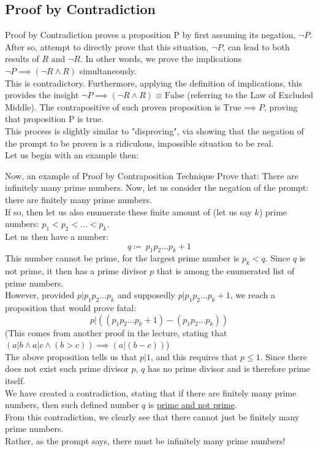 \subsection{Proof by Contradiction}
Proof by Contradiction proves a proposition P by first assuming its negation, $\neg P$. After so, attempt to directly prove that this situation, $\neg P$, can lead to both results of $R$ and $\neg R$. In other words, we prove the implications $\neg P \implies (\neg R \land R)$ simultaneously. \\
This is contradictory. Furthermore, applying the definition of implications, this provides the insight $\neg P \implies (\neg R \land R) \equiv \text{False}$ (referring to the Law of Excluded Middle). The contrapositive of such proven proposition is $\text{True} \implies P$, proving that proposition P is true. \\
This process is slightly similar to "disproving", via showing that the negation of the prompt to be proven is a ridiculous, impossible situation to be real. \\
Let us begin with an example then:
\begin{ln-think}{Now, an example of Proof by Contraposition Technique}{}
    Prove that: There are infinitely many prime numbers.
    \tcblower
    Now, let us consider the negation of the prompt: there are finitely many prime numbers. \\
    If so, then let us also enumerate these finite amount of (let us say $k$) prime numbers: $p_1 < p_2 < \dots < p_k$. \\
    Let us then have a number:
    \[q \coloneqq\ p_1p_2\dots p_k + 1\]
    This number cannot be prime, for the largest prime number is $p_k < q$. Since $q$ is not prime, it then has a prime divisor $p$ that is among the enumerated list of prime numbers. \\
    However, provided $p|p_1p_2\dots p_k$ and supposedly $p|p_1p_2\dots p_k + 1$, we reach a proposition that would prove fatal:
    \[p|((p_1p_2\dots p_k + 1) - (p_1p_2\dots p_k))\]
    (This comes from another proof in the lecture, stating that $(a|b \land a|c \land (b > c)) \implies (a|(b-c))$) \\
    The above proposition tells us that $p|1$, and this requires that $p \leq 1$. Since there does not exist such prime divisor $p$, $q$ has no prime divisor and is therefore prime itself. \\
    We have created a contradiction, stating that if there are finitely many prime numbers, then such defined number $q$ is \underline{prime and not prime}. \\
    From this contradiction, we clearly see that there cannot just be finitely many prime numbers. \\
    Rather, as the prompt says, there must be infinitely many prime numbers!
\end{ln-think}
